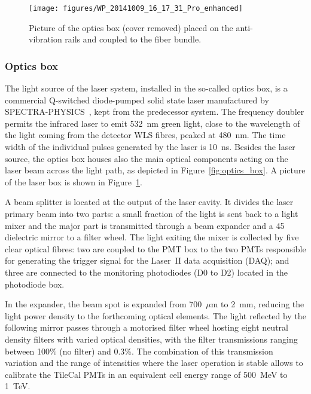 \begin{figure}[htbp]
\begin{center}
     \texttt{[image: figures/WP\_20141009\_16\_17\_31\_Pro\_enhanced]}
    \caption{Picture of the optics box (cover removed) placed on the anti-vibration rails and coupled to the fiber bundle.}\label{pic:optics_box}
\end{center}
\end{figure}

\subsubsection*{Optics box}

The light source of the laser system, installed in the so-called optics box, is a commercial Q-switched diode-pumped solid state laser manufactured by SPECTRA-PHYSICS~\cite{ref:laser}, kept from the predecessor system. The frequency doubler permits the infrared laser to emit 532~nm green light, close to the wavelength of the light coming from the detector WLS fibres, peaked at 480~nm. The time width of the individual pulses generated by the laser is 10~ns. Besides the laser source, the optics box houses also the main optical components acting on the laser beam across the light path, as depicted in Figure~\ref{fig:optics_box}. A picture of the laser box is shown in Figure~\ref{pic:optics_box}.

A beam splitter is located at the output of the laser cavity. It divides the laser primary beam into two parts: a small fraction of the light is sent back to a light mixer and the major part is transmitted through a beam expander and a 45\textdegree{} dielectric mirror to a filter wheel. The light exiting the mixer is collected by five clear optical fibres: two are coupled to the PMT box to the two PMTs responsible for generating the trigger signal for the Laser~II data acquisition (DAQ); and three are connected to the monitoring photodiodes (D0 to D2) located in the photodiode box. 

In the expander, the beam spot is expanded from 700~$\mu$m to 2~mm, reducing the light power density to the forthcoming optical elements. The light reflected by the following mirror passes through a motorised filter wheel hosting eight neutral density filters with varied optical densities, with the filter transmissions ranging between 100\% (no filter) and 0.3\%. The combination of this transmission variation and the range of intensities where the laser operation is stable allows to calibrate the TileCal PMTs in an equivalent cell energy range of 500~MeV to 1~TeV. 

